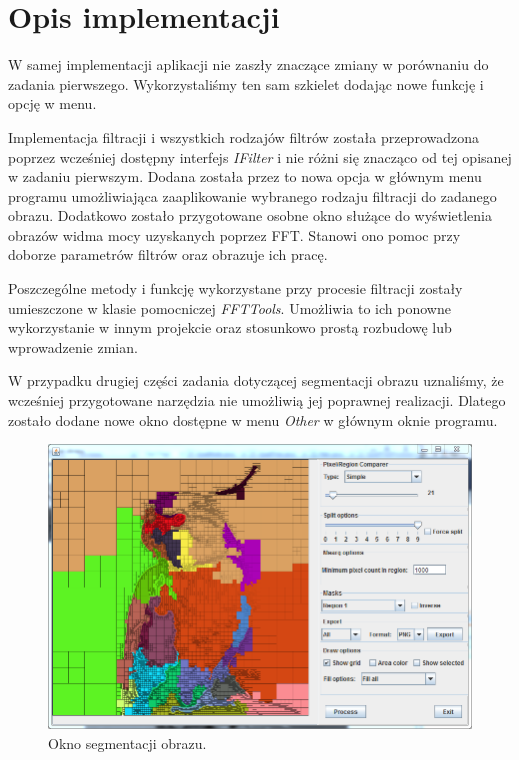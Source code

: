 \documentclass{classrep}
\begin{document}
\section{Opis implementacji}
W samej implementacji aplikacji nie zaszły znaczące zmiany w porównaniu do zadania pierwszego. Wykorzystaliśmy ten sam szkielet dodając nowe funkcję i opcję w menu. 

Implementacja filtracji i wszystkich rodzajów filtrów została przeprowadzona poprzez wcześniej dostępny interfejs \textit{IFilter} i nie różni się znacząco od tej opisanej w zadaniu pierwszym. Dodana została przez to nowa opcja w głównym menu programu umożliwiająca zaaplikowanie wybranego rodzaju filtracji do zadanego obrazu. Dodatkowo zostało przygotowane osobne okno służące do wyświetlenia obrazów widma mocy uzyskanych poprzez FFT. Stanowi ono pomoc przy doborze parametrów filtrów oraz obrazuje ich pracę.

Poszczególne metody i funkcję wykorzystane przy procesie filtracji zostały umieszczone w klasie pomocniczej \textit{FFTTools}. Umożliwia to ich ponowne wykorzystanie w innym projekcie oraz stosunkowo prostą rozbudowę lub wprowadzenie zmian.

W przypadku drugiej części zadania dotyczącej segmentacji obrazu uznaliśmy, że wcześniej przygotowane narzędzia nie umożliwią jej poprawnej realizacji. Dlatego zostało dodane nowe okno dostępne w menu \textit{Other} w głównym oknie programu. 
\begin{figure}[H]
  \centering
  \includegraphics[width=\textwidth]{img/seg/segWindow}
  \caption{Okno segmentacji obrazu.}
  \label{fig_seg_window}
\end{figure}
\end{document}
